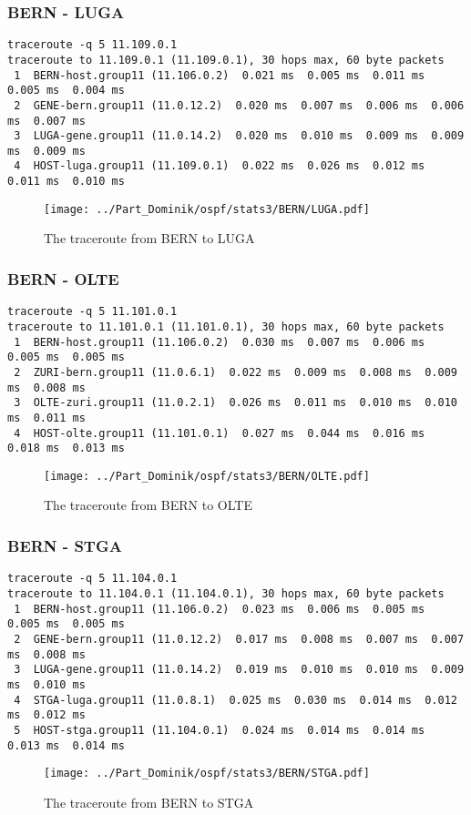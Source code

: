 \subsubsection{BERN - LUGA}
\begin{lstlisting}
traceroute -q 5 11.109.0.1
traceroute to 11.109.0.1 (11.109.0.1), 30 hops max, 60 byte packets
 1  BERN-host.group11 (11.106.0.2)  0.021 ms  0.005 ms  0.011 ms  0.005 ms  0.004 ms
 2  GENE-bern.group11 (11.0.12.2)  0.020 ms  0.007 ms  0.006 ms  0.006 ms  0.007 ms
 3  LUGA-gene.group11 (11.0.14.2)  0.020 ms  0.010 ms  0.009 ms  0.009 ms  0.009 ms
 4  HOST-luga.group11 (11.109.0.1)  0.022 ms  0.026 ms  0.012 ms  0.011 ms  0.010 ms
\end{lstlisting}
\begin{figure}[H]
\centering
\texttt{[image: ../Part\_Dominik/ospf/stats3/BERN/LUGA.pdf]}
\caption{The traceroute from BERN to LUGA}
\end{figure}
\clearpage
\subsubsection{BERN - OLTE}
\begin{lstlisting}
traceroute -q 5 11.101.0.1
traceroute to 11.101.0.1 (11.101.0.1), 30 hops max, 60 byte packets
 1  BERN-host.group11 (11.106.0.2)  0.030 ms  0.007 ms  0.006 ms  0.005 ms  0.005 ms
 2  ZURI-bern.group11 (11.0.6.1)  0.022 ms  0.009 ms  0.008 ms  0.009 ms  0.008 ms
 3  OLTE-zuri.group11 (11.0.2.1)  0.026 ms  0.011 ms  0.010 ms  0.010 ms  0.011 ms
 4  HOST-olte.group11 (11.101.0.1)  0.027 ms  0.044 ms  0.016 ms  0.018 ms  0.013 ms
\end{lstlisting}
\begin{figure}[H]
\centering
\texttt{[image: ../Part\_Dominik/ospf/stats3/BERN/OLTE.pdf]}
\caption{The traceroute from BERN to OLTE}
\end{figure}
\clearpage
\subsubsection{BERN - STGA}
\begin{lstlisting}
traceroute -q 5 11.104.0.1
traceroute to 11.104.0.1 (11.104.0.1), 30 hops max, 60 byte packets
 1  BERN-host.group11 (11.106.0.2)  0.023 ms  0.006 ms  0.005 ms  0.005 ms  0.005 ms
 2  GENE-bern.group11 (11.0.12.2)  0.017 ms  0.008 ms  0.007 ms  0.007 ms  0.008 ms
 3  LUGA-gene.group11 (11.0.14.2)  0.019 ms  0.010 ms  0.010 ms  0.009 ms  0.010 ms
 4  STGA-luga.group11 (11.0.8.1)  0.025 ms  0.030 ms  0.014 ms  0.012 ms  0.012 ms
 5  HOST-stga.group11 (11.104.0.1)  0.024 ms  0.014 ms  0.014 ms  0.013 ms  0.014 ms
\end{lstlisting}
\begin{figure}[H]
\centering
\texttt{[image: ../Part\_Dominik/ospf/stats3/BERN/STGA.pdf]}
\caption{The traceroute from BERN to STGA}
\end{figure}
\clearpage
